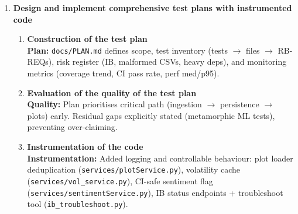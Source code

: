 \documentclass[11pt]{article}
\begin{document}
\begin{enumerate}
\begin{enumerate}
\item \textbf{Assess the appropriateness of your chosen testing approach}\\
\textbf{Appropriateness:} Approaches match risk profile: invariants for oracle-free quant correctness, integration for API/CSV side-effects, perf for latency targets, CI for repeatability. Limitations (IB permissions/market hours; GX Windows toolchain) documented and mitigated (\texttt{ib\_troubleshoot.py}, pinned \texttt{requirements-dev.txt}).
\end{enumerate}
\item \textbf{Design and implement comprehensive test plans with instrumented code} \marginpar{[default 20\%]}
\begin{enumerate}
\item \textbf{Construction of the test plan}\\
\textbf{Plan:} \texttt{docs/PLAN.md} defines scope, test inventory (tests $\rightarrow$ files $\rightarrow$ RB-REQs), risk register (IB, malformed CSVs, heavy deps), and monitoring metrics (coverage trend, CI pass rate, perf med/p95).

\item \textbf{Evaluation of the quality of the test plan}\\
\textbf{Quality:} Plan prioritises critical path (ingestion $\rightarrow$ persistence $\rightarrow$ plots) early. Residual gaps explicitly stated (metamorphic ML tests), preventing over-claiming.

\item \textbf{Instrumentation of the code}\\
\textbf{Instrumentation:} Added logging and controllable behaviour: plot loader deduplication (\texttt{services/plotService.py}), volatility cache (\texttt{services/vol\_service.py}), CI-safe sentiment flag (\texttt{services/sentimentService.py}), IB status endpoints + troubleshoot tool (\texttt{ib\_troubleshoot.py}).


\end{enumerate}
\end{enumerate}
\end{document}
